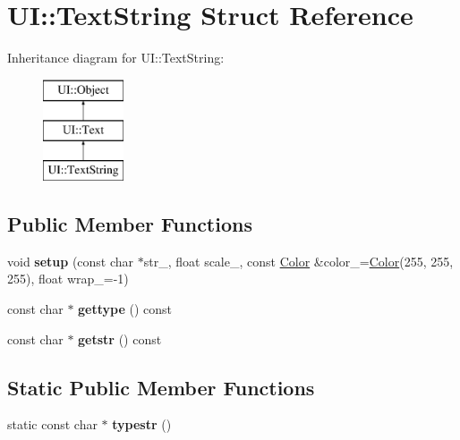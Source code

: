 \hypertarget{struct_u_i_1_1_text_string}{}\section{UI\+:\+:Text\+String Struct Reference}
\label{struct_u_i_1_1_text_string}
Inheritance diagram for UI\+:\+:Text\+String\+:\begin{figure}[H]
\begin{center}
\leavevmode
\includegraphics[height=3.000000cm]{struct_u_i_1_1_text_string}
\end{center}
\end{figure}
\subsection*{Public Member Functions}
\begin{DoxyCompactItemize}
\item 
\mbox{\label{struct_u_i_1_1_text_string_abc652e3d3a43cf16bf371e84e650e301}} 
void {\bfseries setup} (const char $\ast$str\+\_\+, float scale\+\_, const \hyperlink{struct_u_i_1_1_color}{Color} \&color\+\_\+=\hyperlink{struct_u_i_1_1_color}{Color}(255, 255, 255), float wrap\+\_\+=-\/1)
\item 
\mbox{\label{struct_u_i_1_1_text_string_a1b38fcf05a0f8d8ffc461136f6e40199}} 
const char $\ast$ {\bfseries gettype} () const
\item 
\mbox{\label{struct_u_i_1_1_text_string_a2b399edfe05be43f09d7359a9b532e6c}} 
const char $\ast$ {\bfseries getstr} () const
\end{DoxyCompactItemize}
\subsection*{Static Public Member Functions}
\begin{DoxyCompactItemize}
\item 
\mbox{\label{struct_u_i_1_1_text_string_a2d93deb9937d3ca210a92e7af67d3e4f}} 
static const char $\ast$ {\bfseries typestr} ()
\end{DoxyCompactItemize}
